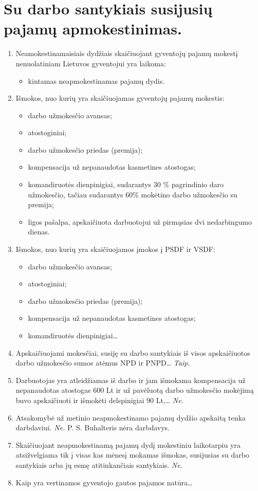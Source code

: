 \chapter{Su darbo santykiais susijusių pajamų apmokestinimas.}

\begin{enumerate}
  \item Neamokestinamaisiais dydžiais skaičiuojant gyventojų pajamų
    mokestį nenuolatiniam Lietuvos gyventojui yra laikoma:
    \begin{itemize}
      \item kintamas neapmokestinamas pajamų dydis.
    \end{itemize}
  \item Išmokos, nuo kurių yra skaičiuojamas gyventojų pajamų mokestis:
    \begin{itemize}
      \item darbo užmokesčio avansas;
      \item atostoginiai;
      \item darbo užmokesčio priedas (premija);
      \item kompensacija už nepanaudotas kasmetines atostogas;
      \item komandiruotės dienpinigiai, sudarantys 30 \% pagrindinio
        daro užmokesčio, tačiau sudarantys 60\% mokėtino darbo
        užmokesčio su premija;
      \item ligos pašalpa, apskaičiuota darbuotojui už pirmąsias dvi
        nedarbingumo dienas.
    \end{itemize}
  \item Išmokos, nuo kurių yra skaičiuojamos įmokos į PSDF ir VSDF:
    \begin{itemize}
      \item darbo užmokesčio avansas;
      \item atostoginiai;
      \item darbo užmokesčio priedas (premija);
      \item kompensacija už nepanaudotas kasmetines atostogas;
      \item komandiruotės dienpinigiai…
    \end{itemize}
  \item Apskaičiuojami mokesčiai, susiję su darbo santykiais iš visos
    apskaičiuotos darbo užmokesčio sumos atėmus NPD ir PNPD…
    \emph{Taip.}
  \item Darbuotojas yra atleidžiamas iš darbo ir jam išmokama kompensacija
    už nepanaudotas atostogas 600 Lt ir už pavėluotą darbo užmokesčio
    mokėjimą buvo apskaičiuoti ir išmokėti delspinigiai 90 Lt,…
    \emph{Ne.}
  \item Atsakomybė už metinio neapmokestinamo pajamų dydžio apskaitą
    tenka darbdaviui.
    \emph{Ne.}
    P. S. Buhalteris nėra darbdavys.
  \item Skaičiuojant neapmokestinamą pajamų dydį mokestiniu laikotarpiu
    yra atsižvelgiama tik į visas kas mėnesį mokamas išmokas, susijusias
    su darbo santykiais arba jų esmę atitinkančiais santykiais.
    \emph{Ne.}
  \item Kaip yra vertinamos gyventojo gautos pajamos natūra…


\end{enumerate}
